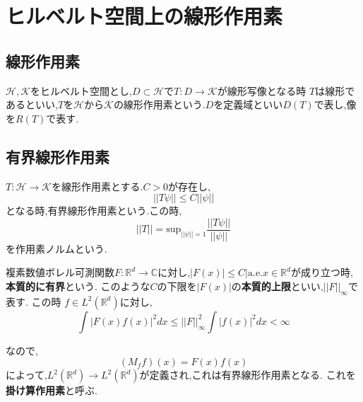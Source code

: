 \documentclass[uplatex]{jsbook}
\begin{document}
\chapter{ヒルベルト空間上の線形作用素}
\section{線形作用素}
$\mathcal{H}, \mathcal{K}$をヒルベルト空間とし,$D \subset \mathcal{H}$で$T:D \to \mathcal{K}$が線形写像となる時
$T$は線形であるといい,$T$を$\mathcal{H}$から$\mathcal{K}$の線形作用素という.$D$を定義域といい$D(T)$で表し,像を$R(T)$で表す.

\section{有界線形作用素}
\begin{screen}
\begin{dfn}
 $T: \mathcal{H} \to \mathcal{K}$を線形作用素とする.$C > 0$が存在し,
 \begin{equation*}
  ||T\psi || \le C || \psi ||
 \end{equation*}
となる時,有界線形作用素という.この時,
\begin{equation*}
  ||T|| = \mathrm{sup}_{||\psi|| = 1} \frac{||T\psi||}{||\psi||}
\end{equation*}
を作用素ノルムという.
\end{dfn}
\end{screen}

\begin{epl}
複素数値ボレル可測関数$F: \mathbb{R}^d \to \mathbb{C}$に対し,$\lvert F(x) \rvert \le C| \mathrm{a.e.} x \in \mathbb{R}^d$が成り立つ時,\textbf{本質的に有界}という.
このような$C$の下限を$|F(x)|$の\textbf{本質的上限}といい,$||F||_{\infty}$で表す.
この時 $f \in L^2(\mathbb{R}^d)$に対し,
\begin{equation*}
 \int |F(x)f(x)|^2 dx \le ||F||^2_{\infty} \int |f(x)|^2 dx < \infty
\end{equation*}
\end{epl}
なので,
\begin{equation*}
(M_ff)(x) = F(x)f(x)
\end{equation*}
によって,$L^2(\mathbb{R}^d) \to L^2(\mathbb{R}^d)$が定義され,これは有界線形作用素となる.
これを\textbf{掛け算作用素}と呼ぶ.
\end{document}
